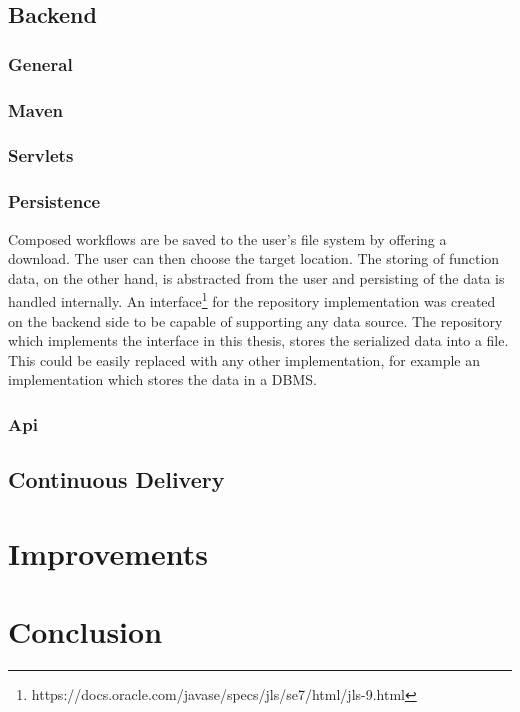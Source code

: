 \documentclass[a4paper,11pt,pdftex,halfparskip,cleardoubleempty]{scrbook}
\begin{document}

\subsection{Backend}
\subsubsection{General}
\subsubsection{Maven}
\subsubsection{Servlets}
\subsubsection{Persistence}
\label{Backend-Persistence}

Composed workflows are be saved to the user's file system by offering a download. The user can then choose the target location.
The storing of function data, on the other hand, is abstracted from the user and persisting of the data is handled internally.
An interface\footnote{https://docs.oracle.com/javase/specs/jls/se7/html/jls-9.html} for the repository implementation was created on the backend side to be capable of supporting any data source. The repository which implements the interface in this thesis, stores the serialized data into a file. This could be easily replaced with any other implementation, for example an implementation which stores the data in a DBMS.

\subsubsection{Api}


\subsection{Continuous Delivery}

\section{Improvements}

\section{Conclusion}


\nocite{*}



\end{document}
